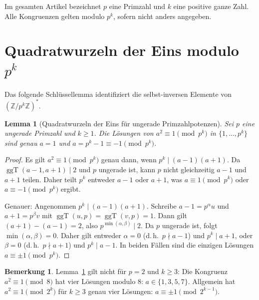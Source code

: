 \documentclass[12pt,a4paper]{amsart}
\newtheorem{lemma}[theorem]{Lemma}
\theoremstyle{definition}
\newtheorem{bemerkung}[theorem]{Bemerkung}
\newcommand{\Z}{\mathbb{Z}}
\DeclareMathOperator{\ggT}{ggT}
\begin{document}
Im gesamten Artikel bezeichnet $p$ eine Primzahl und $k$ eine positive ganze
Zahl. Alle Kongruenzen gelten modulo $p^k$, sofern nicht anders angegeben.

\section{Quadratwurzeln der Eins modulo \texorpdfstring{$p^k$}{p hoch k}}

Das folgende Schlüssellemma identifiziert die selbst-inversen Elemente von
$(\Z/p^k\Z)^*$.

\begin{lemma}[Quadratwurzeln der Eins für ungerade Primzahlpotenzen]%
  \label{lem:quadratwurzel_eins}
  Sei $p$ eine ungerade Primzahl und $k \geq 1$. Die Lösungen von
  $a^2 \equiv 1 \pmod{p^k}$ in $\{1, \ldots, p^k\}$ sind genau
  $a = 1$ und $a = p^k - 1 \equiv -1 \pmod{p^k}$.
\end{lemma}

\begin{proof}
  Es gilt $a^2 \equiv 1 \pmod{p^k}$ genau dann, wenn $p^k \mid (a-1)(a+1)$.
  Da $\ggT(a-1, a+1) \mid 2$ und $p$ ungerade ist, kann $p$ nicht gleichzeitig
  $a-1$ und $a+1$ teilen. Daher teilt $p^k$ entweder $a-1$ oder $a+1$, was
  $a \equiv 1 \pmod{p^k}$ oder $a \equiv -1 \pmod{p^k}$ ergibt.

  Genauer: Angenommen $p^k \mid (a-1)(a+1)$. Schreibe $a - 1 = p^\alpha u$
  und $a + 1 = p^\beta v$ mit $\ggT(u,p) = \ggT(v,p) = 1$.
  Dann gilt $(a+1) - (a-1) = 2$, also $p^{\min(\alpha,\beta)} \mid 2$.
  Da $p$ ungerade ist, folgt $\min(\alpha, \beta) = 0$.
  Daher gilt entweder $\alpha = 0$ (d.\,h.\ $p \nmid a-1$) und $p^k \mid a+1$,
  oder $\beta = 0$ (d.\,h.\ $p \nmid a+1$) und $p^k \mid a-1$.
  In beiden Fällen sind die einzigen Lösungen $a \equiv \pm 1 \pmod{p^k}$.
\end{proof}

\begin{bemerkung}
  Lemma~\ref{lem:quadratwurzel_eins} gilt nicht für $p = 2$ und $k \geq 3$:
  Die Kongruenz $a^2 \equiv 1 \pmod{8}$ hat vier Lösungen modulo $8$:
  $a \in \{1, 3, 5, 7\}$. Allgemein hat $a^2 \equiv 1 \pmod{2^k}$
  für $k \geq 3$ genau vier Lösungen: $a \equiv \pm 1 \pmod{2^{k-1}}$.
\end{bemerkung}

\end{document}
